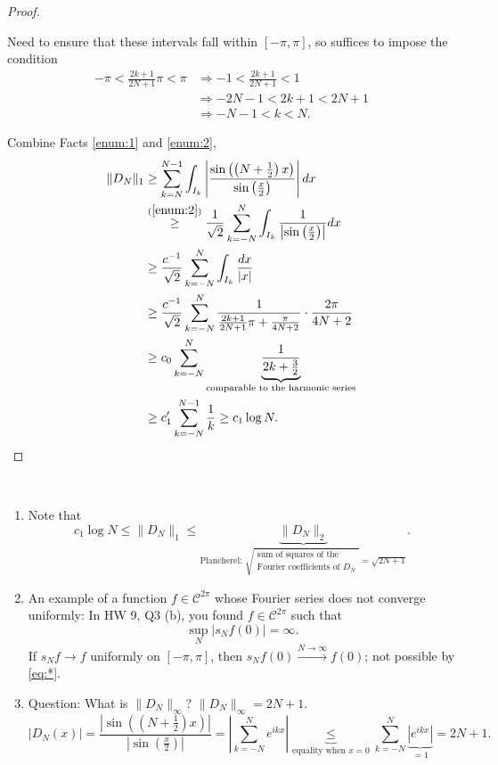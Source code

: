 \documentclass[letterpaper, reqno,11pt]{article}
\begin{document}
\begin{proof}
\begin{enumerate}
    Need to ensure that these intervals fall within $[-\pi, \pi]$, so suffices to impose the condition
    \begin{align*}
      -\pi < \frac{2k + 1}{2N + 1} \pi < \pi & \Rightarrow -1 < \frac{2k + 1}{2N + 1} < 1 \\
      & \Rightarrow -2N - 1 < 2k + 1 < 2N + 1 \\
      & \Rightarrow \boxed{-N - 1 < k < N}.
    \end{align*}
  \end{enumerate}
  
  Combine Facts \ref{enum:1} and \ref{enum:2},
  \begin{align*}
    \lVert D_N \rVert_1 &\geq \sum_{k = N}^{N - 1} \int_{I_k} \left|\frac{\sin\left(\left(N + \frac{1}{2}\right) x\right)}{\sin\left(\frac{x}{2}\right)}\right| dx \\
    &\overset{(\ref{enum:2})}{\geq} \frac{1}{\sqrt 2} \sum_{k = -N}^N \int_{I_k} \frac{1}{\left|\sin\left(\frac{x}{2}\right)\right|} dx \\
    &\geq \frac{c^{-1}}{\sqrt 2} \sum_{k = -N}^N \int_{I_k} \frac{dx}{|x|} \\
    &\geq \frac{c^{-1}}{\sqrt 2} \sum_{k = -N}^N \frac{1}{\frac{2k + 1}{2N + 1} \pi + \frac{\pi}{4N + 2}} \cdot \frac{2\pi}{4N + 2} \\
    &\geq c_0 \sum_{k = -N}^N \underbrace{\frac{1}{2k + \frac{3}{2}}}_\text{comparable to the harmonic series} \\
    &\geq c_1' \sum_{k = -N}^{N - 1} \frac{1}{k} \geq c_1 \log N.
  \end{align*}
\end{proof}

\begin{remark}
  \normalfont
  ~
  
  \begin{enumerate}
  \item Note that
    \[ c_1 \log N \leq \lVert D_N \rVert_1 \leq \underbrace{\lVert D_N \rVert_2}_\text{Plancherel: $\sqrt{\substack{\text{sum of squares of the} \\ \text{Fourier coefficients of $D_N$}}} = \sqrt{2N + 1}$}. \]
  \item An example of a function $f \in \mathcal C^{2\pi}$ whose Fourier series does not converge uniformly: In HW 9, Q3 (b), you found $f \in \mathcal C^{2\pi}$ such that
    \begin{equation} \label{eq:*} \tag{*}
      \sup_N |s_N f(0)| = \infty.
    \end{equation}
    If $s_N f \to f$ uniformly on $[-\pi, \pi]$, then $s_N f(0) \xrightarrow{N \to \infty} f(0)$; not possible by \eqref{eq:*}.
  \item Question: What is $\lVert D_N \rVert_\infty$? $\lVert D_N \rVert_\infty = 2N + 1$.
    \[ |D_N(x)| = \frac{\left|\sin\left(\left(N + \frac{1}{2}\right) x\right)\right|}{\left|\sin\left(\frac{x}{2}\right)\right|} = \left|\sum_{k = -N}^N e^{ikx}\right| \underbrace{\leq}_\text{equality when $x = 0$} \sum_{k = -N}^N \underbrace{\left|e^{ikx}\right|}_{= 1} = 2N + 1. \]
  \end{enumerate}
\end{remark}
\end{document}
